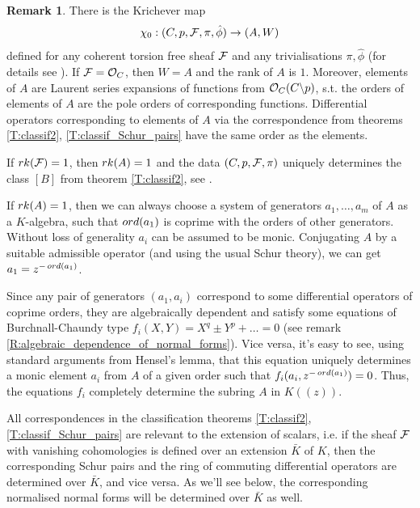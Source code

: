 \documentclass[11pt]{article}
\theoremstyle{definition}
\newcommand{\ord}{\mathop{\rm ord}\nolimits}
\newcommand{\rk}{\mathop {\rm rk}}
\newtheorem{rem}{Remark}[section]
\theoremstyle{plain}
\numberwithin{equation}{section}
\newcommand{\co}{{{\cal O}}}
\newcommand{\cf}{{{\cal F}}}
\begin{document}
\begin{rem}
\label{R:Krichever_map}
There is the Krichever map 
$$
\chi_0:(C,p,\cf ,\pi , \hat{\phi} ) \rightarrow (A,W)
$$
defined for any coherent torsion free sheaf $\cf$ and any trivialisations $\pi, \hat{\phi}$ (for details see \cite[Ch.10]{Zheglov_book}). If $\cf =\co_C$, then $W=A$ and the rank of $A$ is $1$. Moreover, elements of $A$ are Laurent series expansions of functions from $\co_C(C\backslash p)$, s.t. the orders of elements of $A$ are the pole orders of corresponding functions. Differential operators corresponding to elements of $A$ via the correspondence from theorems \ref{T:classif2}, \ref{T:classif_Schur_pairs} have the same order as the elements. 

If $\rk (\cf )=1$, then $\rk (A)=1$ and the data $(C,p,\cf ,\pi )$ uniquely determines the class $[B]$ from theorem \ref{T:classif2}, see \cite[Rem. 10.24]{Zheglov_book}. 

If $\rk (A)=1$, then we can always choose a system of generators $a_1, \ldots , a_m$ of $A$ as a $K$-algebra,  such that $\ord (a_1)$ is coprime with the orders of other generators. Without loss of generality $a_i$ can be assumed to be monic. Conjugating $A$ by a suitable admissible operator (and using the usual Schur theory), we can get $a_1=z^{-\ord (a_1)}$. 

Since any pair of generators $(a_1, a_i)$ correspond to some differential operators of coprime orders, they are algebraically dependent and satisfy  some equations of Burchnall-Chaundy type $f_i(X,Y) =  X^q\pm Y^p+\ldots =0$ (see remark \ref{R:algebraic_dependence_of_normal_forms}). Vice versa, it's easy to see, using standard arguments from Hensel's lemma, that this equation uniquely determines a monic element $a_i$ from $A$ of a given order such that $f_i(a_i, z^{-\ord (a_1)})=0$. Thus, the equations $f_i$ completely determine the subring $A$ in $K((z))$. 

All correspondences in the classification theorems \ref{T:classif2}, \ref{T:classif_Schur_pairs} are relevant to the extension of scalars, i.e. if the sheaf $\cf$ with vanishing cohomologies is defined over an extension $\bar{K}$ of $K$, then the corresponding Schur pairs and the ring of commuting differential operators are determined over $\bar{K}$, and vice versa. As we'll see below, the corresponding  normalised normal forms will be determined over $\bar{K}$ as well.
\end{rem}
\end{document}
